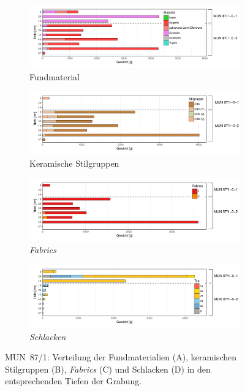 \begin{figure}[p]
	\centering
	\begin{subfigure}{\textwidth}	
		\centering
		\includegraphics[width = \textwidth]{fig/9-12_MUN87-1_VerteilungFunde_R.pdf}
		\caption{Fundmaterial\vspace{1em}}	
		\label{fig:MUN87-1_VerteilungFunde}
	\end{subfigure}
	\begin{subfigure}{\textwidth}
		\centering
		\includegraphics[width = \textwidth]{fig/9-12_MUN87-1_KeramikStilgruppen_R.pdf}
		\caption{Keramische Stilgruppen\vspace{1em}}
		\label{fig:MUN87-1_VerteilungStilgr}
	\end{subfigure}
	\begin{subfigure}{\textwidth}	
		\centering
		\includegraphics[width = \textwidth]{fig/9-12_MUN87-1_Fabrics_R.pdf}
		\caption{\textit{Fabrics}\vspace{1em}}
		\label{fig:MUN87-12_VerteilungFabrics}
	\end{subfigure}
	\begin{subfigure}{\textwidth}	
	\centering
		\includegraphics[width = \textwidth]{fig/9-12_MUN87-1_Schlacken_R.pdf}
		\caption{\textit{Schlacken}}
		\label{fig:MUN87-12_Schlacken}
	\end{subfigure}
	\caption{MUN~87/1: Verteilung der Fundmaterialien (A), keramischen Stilgruppen (B), \textit{Fabrics} (C) und Schlacken (D) in den entsprechenden Tiefen der Grabung.}
	\label{fig:MUN87-1_Funde}
\end{figure}

